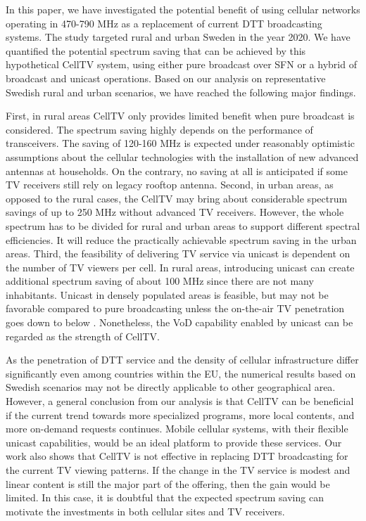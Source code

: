 \documentclass[journal]{IEEEtran}
\begin{document}
In this paper, we have investigated the potential benefit of using cellular networks operating in 470-790 MHz as a replacement of current DTT broadcasting systems. The study targeted rural and urban Sweden in the year 2020. We have quantified the potential spectrum saving that can be achieved by this hypothetical CellTV system, using either pure broadcast over SFN or a hybrid of broadcast and unicast operations. Based on our analysis on representative Swedish rural and urban scenarios, we have reached the following major findings.

First, in rural areas CellTV only provides limited benefit when pure broadcast is considered. The spectrum saving highly depends on the performance of transceivers. The saving of 120-160 MHz is expected under reasonably optimistic assumptions about the cellular technologies with the installation of new advanced antennas at households. On the contrary, no saving at all is anticipated if some TV receivers still rely on legacy rooftop antenna. Second, in urban areas, as opposed to the rural cases, the CellTV may bring about considerable spectrum savings of up to 250 MHz without advanced TV receivers. However, the whole spectrum has to be divided for rural and urban areas to support different spectral efficiencies. It will reduce the practically achievable spectrum saving in the urban areas. Third, the feasibility of delivering TV service via unicast is dependent on the number of TV viewers per cell. In rural areas, introducing unicast can create additional spectrum saving of about 100 MHz since there are not many inhabitants. Unicast in densely populated areas is feasible, but may not be favorable compared to pure broadcasting unless the on-the-air TV penetration goes down to below . Nonetheless, the VoD capability enabled by unicast can be regarded as the strength of CellTV.

As the penetration of DTT service and the density of cellular infrastructure differ significantly even among countries within the EU, the numerical results based on Swedish scenarios may not be directly applicable to other geographical area. However, a general conclusion from our analysis is that CellTV can be beneficial if the current trend towards more specialized programs, more local contents, and more on-demand requests continues. Mobile cellular systems, with their flexible unicast capabilities, would be an ideal platform to provide these services. Our work also shows that CellTV is not effective in replacing DTT broadcasting for the current TV viewing patterns. If the change in the TV service is modest and linear content is still the major part of the offering, then the gain would be limited. In this case, it is doubtful that the expected spectrum saving can motivate the investments in both cellular sites and TV receivers.
\end{document}
